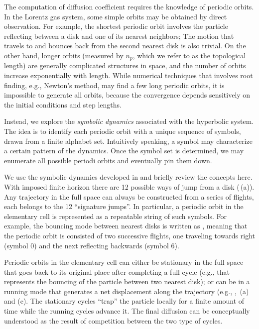 


The computation of diffusion coefficient  requires
the knowledge of periodic orbits. In the Lorentz gas system, some
simple orbits may be obtained by direct observation. For example, the
shortest periodic orbit involves the particle reflecting between a disk
and one of its nearest neighbors; The motion that travels to and
bounces back from the second nearest disk is also trivial. On the
other hand, longer orbits (measured by $n_p$, which we refer to as the
topological length) are generally complicated structures in space, and
the number of orbits increase exponentially with length.  While
numerical techniques that involves root finding, e.g., Newton's method,
may find a few long periodic orbits, it is impossible to generate
all orbits, because the convergence depends sensitively on the initial
conditions and step lengths.

Instead, we explore the \emph{symbolic dynamics} associated with the
hyperbolic system. The idea is to identify each periodic orbit with a
unique sequence of symbols, drawn from a finite alphabet set.
Intuitively speaking, a symbol may characterize a certain pattern of
the dynamics. Once the symbol set is determined, we may enumerate all
possible periodi orbits and eventually pin them down.

We use the symbolic dynamics developed in  and briefly
review the concepts here. With imposed finite horizon there are 12
possible ways of jump from a disk
(\,(a)). Any trajectory in the full
space can always be constructed from a series of flights, each belongs
to the 12 ``signature jumps''. In particular, a periodic orbit in the
elementary cell is represented as a repeatable string of such symbols.
For example, the bouncing mode between nearest disks is written as
, meaning that the periodic orbit is consisted of two
successive flights, one traveling towards right (symbol $0$) and the
next reflecting backwards (symbol $6$).

Periodic orbits in the elementary cell can either be stationary in the
full space that goes back to its original place after completing a
full cycle (e.g.,  that represents the bouncing of the
particle between two nearest disk); or can be in a running mode that
generates a net displacement along the trajectory (e.g., ,
\,(a) and (c). The stationary cycles
``trap'' the  particle locally for a finite amount of time while the
running cycles advance it. The final diffusion 
can be conceptually understood as the result of competition between
the two type of cycles.

